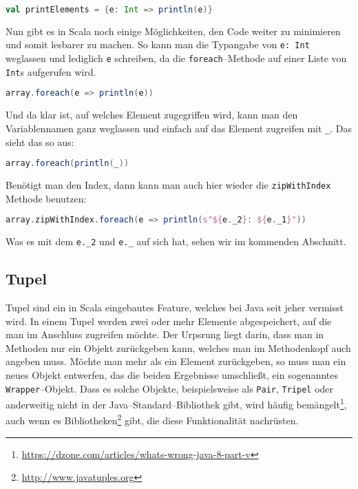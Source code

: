 \begin{lstlisting}[language=Scala,numbers=none]
val printElements = {e: Int => println(e)}
\end{lstlisting}

Nun gibt es in Scala noch einige Möglichkeiten, den Code weiter zu minimieren und somit lesbarer zu machen. So kann man die Typangabe von \texttt{e: Int} weglassen und lediglich \texttt{e} schreiben, da die \texttt{foreach}--Methode auf einer Liste von \texttt{Int}s aufgerufen wird.

\begin{lstlisting}[language=Scala,numbers=none]
array.foreach(e => println(e))
\end{lstlisting}

Und da klar ist, auf welches Element zugegriffen wird, kann man den Variablennamen ganz weglassen und einfach auf das Element zugreifen mit \texttt{\_}. Das sieht das so aus:

\begin{lstlisting}[language=Scala,numbers=none]
array.foreach(println(_))
\end{lstlisting}

Benötigt man den Index, dann kann man auch hier wieder die \texttt{zipWithIndex} Methode benutzen:

\begin{lstlisting}[language=Scala,numbers=none]
array.zipWithIndex.foreach(e => println(s"${e._2}: ${e._1}"))
\end{lstlisting}

Was es mit dem \texttt{e.\_2} und \texttt{e.\_} auf sich hat, sehen wir im kommenden Abschnitt.

\subsection{Tupel}
Tupel sind ein in Scala eingebautes Feature, welches bei Java seit jeher vermisst wird. In einem Tupel werden zwei oder mehr Elemente abgespeichert, auf die man im Anschluss zugreifen möchte. Der Urpsrung liegt darin, dass man in Methoden nur ein Objekt zurückgeben kann, welches man im Methodenkopf auch angeben muss. Möchte man mehr als ein Element zurückgeben, so muss man ein neues Objekt entwerfen, das die beiden Ergebnisse umschließt, ein sogenanntes \texttt{Wrapper}--Objekt. Dass es solche Objekte, beispielsweise als \texttt{Pair}, \texttt{Tripel} oder anderweitig nicht in der Java--Standard--Bibliothek gibt, wird häufig bemängelt\footnote{\url{https://dzone.com/articles/whats-wrong-java-8-part-v}}, auch wenn es Bibliotheken\footnote{\url{http://www.javatuples.org}} gibt, die diese Funktionalität nachrüsten.

